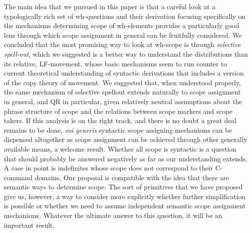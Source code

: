 \documentclass[charis]{glossa}
\begin{document}
The main idea that we pursued in this paper is that a careful look at a typologically rich set of wh-questions and their derivation focusing specifically on the mechanisms determining scope of wh-elements provides a particularly good lens through which scope assignment in general can be fruitfully considered.  We concluded that the most promising way to look at wh-scope is through \textit{selective spell-out}, which we suggested is a better way to understand the distributions than its relative, LF-movement, whose basic mechanisms seem to run counter to current theoretical understanding of syntactic derivations that includes a version of the copy theory of movement.
We suggested that, when understood properly, the same mechanism of selective spellout extends naturally to scope assignment in general, and QR in particular, given relatively neutral assumptions about the phrase structure of scope and the relations between scope markers and scope takers.  If this analysis is on the right track, and there is no doubt a great deal remains to be done, \textit{sui generis} syntactic scope assigning mechanisms can be dispensed altogether as scope assignment can be achieved through other generally available means, a welcome result.  Whether all scope is syntactic is a question that should probably be answered negatively as far as our understanding extends.  A case in point is indefinites whose scope does not correspond to their C-command domains.  Our proposal is compatible with the idea that there are semantic ways to determine scope. The sort of primitives that we have proposed give us, however, a way to consider more explicitly whether further simplification is possible or whether we need to assume independent semantic scope assignment mechanisms.  Whatever the ultimate answer to this question, it will be an important result.



\end{document}
